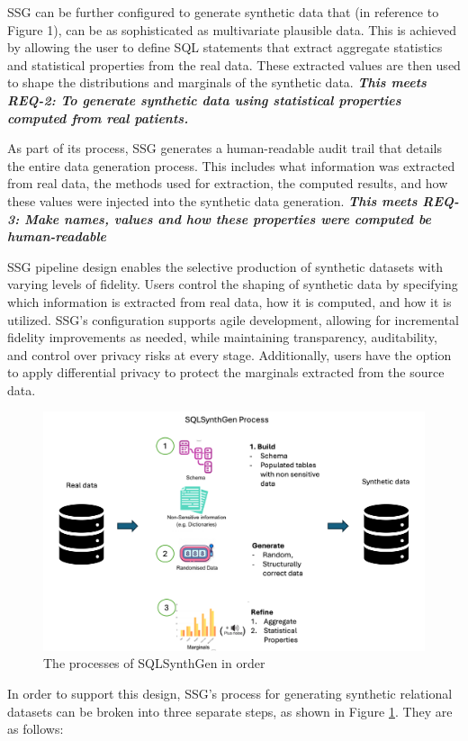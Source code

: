 \documentclass[11pt]{article}
\begin{document}
SSG can be further configured to generate synthetic data that (in reference to Figure 1), can be as sophisticated as multivariate plausible data. This is achieved by allowing the user to define SQL statements that extract aggregate statistics and statistical properties from the real data. These extracted values are then used to shape the distributions and marginals of the synthetic data. \textbf{\textit{This meets REQ-2: To generate synthetic data using statistical properties computed from real patients.}} 

As part of its process, SSG generates a human-readable audit trail that details the entire data generation process. This includes what information was extracted from real data, the methods used for extraction, the computed results, and how these values were injected into the synthetic data generation. \textbf{\textit{This meets REQ-3: Make names, values and how these properties were computed be human-readable}}

SSG pipeline design enables the selective production of synthetic datasets with varying levels of fidelity. Users control the shaping of synthetic data by specifying which information is extracted from real data, how it is computed, and how it is utilized. SSG’s configuration supports agile development, allowing for incremental fidelity improvements as needed, while maintaining transparency, auditability, and control over privacy risks at every stage. Additionally, users have the option to apply differential privacy to protect the marginals extracted from the source data.

\begin{figure}[ht]
\centering
\includegraphics[width=0.8\linewidth]{figures/Process.png}
\caption{The processes of SQLSynthGen in order}
\label{fig:SSG Process}
\end{figure}

In order to support this design, SSG's process for generating synthetic relational datasets can be broken into three separate steps, as shown in Figure \ref{fig:SSG Process}. They are as follows:
\end{document}

